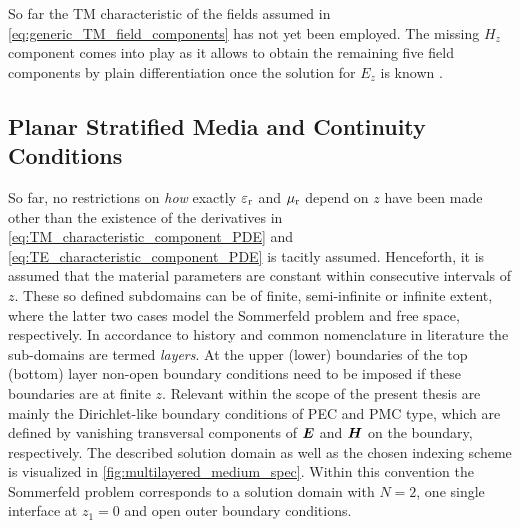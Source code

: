 So far the \ac{TM} characteristic of the fields assumed in
\eqref{eq:generic_TM_field_components} has not yet been employed.
The missing $H_z$ component comes into play as it allows to obtain the
remaining five field components by plain differentiation once the solution for
$E_z$ is known \cite[\S\S2.3.3]{Chew1999}.







\subsection{Planar Stratified Media and Continuity Conditions}
\label{subsec:layered_media_and_continuity_conditions}

So far, no restrictions on \emph{how} exactly $\varepsilon_{\mathrm{r}}$ and $\mu_{\mathrm{r}}$ depend on $z$
have been made other than the existence of the derivatives in
\eqref{eq:TM_characteristic_component_PDE} and
\eqref{eq:TE_characteristic_component_PDE} is tacitly assumed.
Henceforth, it is assumed that the material parameters are constant within
consecutive intervals of $z$.
These so defined subdomains can be of finite, semi-infinite or infinite extent,
where the latter two cases model the Sommerfeld problem and free space,
respectively.
In accordance to history and common nomenclature in literature the sub-domains
are termed \emph{layers}.
At the upper (lower) boundaries of the top (bottom) layer non-open boundary
conditions  need to be imposed if these boundaries are at finite $z$.
Relevant within the scope of the present thesis are mainly the Dirichlet-like
boundary conditions of \ac{PEC} and \ac{PMC} type, which are defined by
vanishing transversal components of $\pvec{E}$ and $\pvec{H}$ on the boundary,
respectively.
The described solution domain as well as the chosen indexing scheme is
visualized in \cref{fig:multilayered_medium_spec}.
Within this convention the Sommerfeld problem corresponds to a solution domain
with $N=2$, one single interface at $z_1 = 0$ and open outer boundary
conditions.

